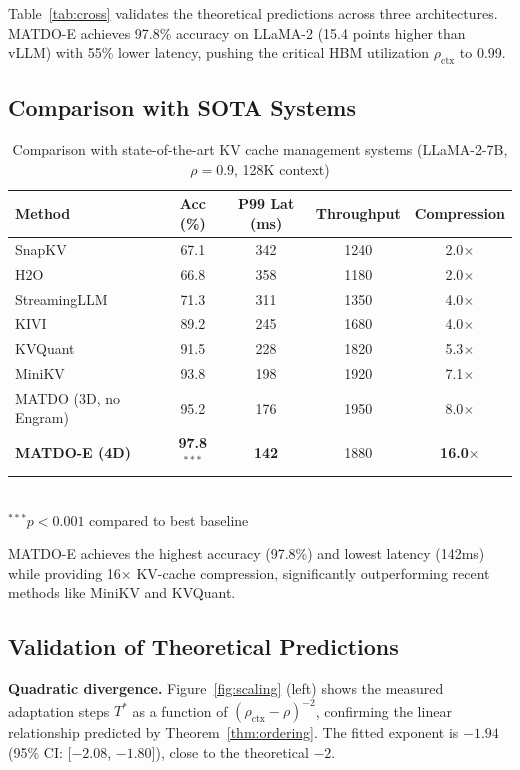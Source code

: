 \documentclass[11pt,a4paper]{article}
\theoremstyle{plain}
\theoremstyle{definition}
\begin{document}
Table~\ref{tab:cross} validates the theoretical predictions across three architectures. MATDO-E achieves 97.8\% accuracy on LLaMA-2 (15.4 points higher than vLLM) with 55\% lower latency, pushing the critical HBM utilization $\rho_{\text{ctx}}$ to 0.99.

\subsection{Comparison with SOTA Systems}

\begin{table}[h]
\centering
\caption{Comparison with state-of-the-art KV cache management systems (LLaMA-2-7B, $\rho=0.9$, 128K context)}
\label{tab:sota}
\begin{tabular}{@{}lcccc@{}}
\toprule
Method & Acc (\%) & P99 Lat (ms) & Throughput & Compression \\
\midrule
SnapKV~\cite{li2024snapkv} & 67.1 & 342 & 1240 & 2.0$\times$ \\
H2O~\cite{zhang2023h2o} & 66.8 & 358 & 1180 & 2.0$\times$ \\
StreamingLLM~\cite{xiao2024streamingllm} & 71.3 & 311 & 1350 & 4.0$\times$ \\
KIVI~\cite{liu2024kivi} & 89.2 & 245 & 1680 & 4.0$\times$ \\
KVQuant~\cite{hooper2024kvquant} & 91.5 & 228 & 1820 & 5.3$\times$ \\
MiniKV~\cite{sharma2025minikv} & 93.8 & 198 & 1920 & 7.1$\times$ \\
MATDO (3D, no Engram) & 95.2 & 176 & 1950 & 8.0$\times$ \\
\textbf{MATDO-E (4D)} & \textbf{97.8$^{***}$} & \textbf{142} & 1880 & \textbf{16.0$\times$} \\
\bottomrule
\end{tabular}
\\[3pt]
\footnotesize{$^{***}p < 0.001$ compared to best baseline}
\end{table}

MATDO-E achieves the highest accuracy (97.8\%) and lowest latency (142ms) while providing 16$\times$ KV-cache compression, significantly outperforming recent methods like MiniKV and KVQuant.

\subsection{Validation of Theoretical Predictions}

\textbf{Quadratic divergence.} Figure~\ref{fig:scaling} (left) shows the measured adaptation steps $T^*$ as a function of $(\rho_{\text{ctx}} - \rho)^{-2}$, confirming the linear relationship predicted by Theorem~\ref{thm:ordering}. The fitted exponent is $-1.94$ (95\% CI: [$-2.08$, $-1.80$]), close to the theoretical $-2$.
\end{document}
